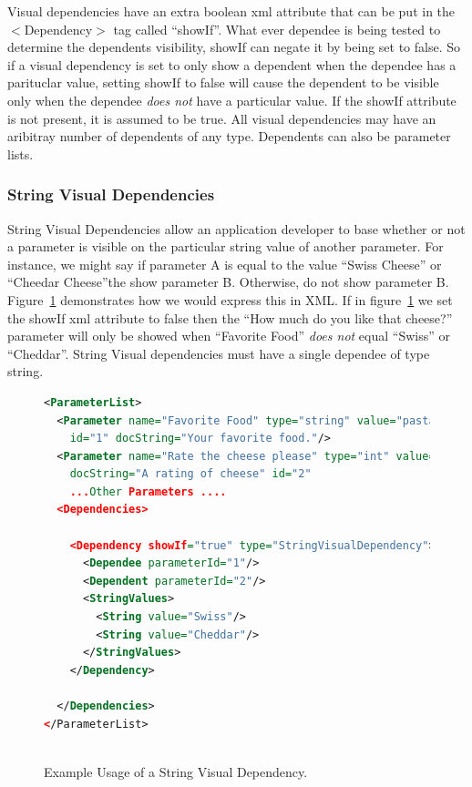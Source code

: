 Visual dependencies have an extra boolean xml attribute that can be put in the $<$Dependency$>$ tag called ``showIf''. What ever dependee is being tested to 
determine the dependents visibility, showIf can negate it by being set to false. So if a visual dependency is set to only show a dependent when the
dependee has a parituclar value, setting showIf to false will cause the dependent to be visible only when the dependee \emph{does not} have a particular
value. If the showIf attribute is not present, it is assumed to be true. All visual dependencies may have an aribitray number of dependents of any type.
Dependents can also be parameter lists.

\subsubsection{String Visual Dependencies}
String Visual Dependencies allow an application developer to base whether or not a parameter is visible on the particular string value of another
parameter. For instance, we might say if parameter A is equal to the value ``Swiss Cheese'' or ``Cheedar Cheese''the show parameter B. Otherwise, do not 
show parameter B. Figure~\ref{StringVisXML} demonstrates how we would express this in XML.  If in figure~\ref{StringVisXML} we set the showIf xml attribute to false then the ``How much do you like that cheese?'' parameter will only be showed when ``Favorite Food'' \emph{does not} equal ``Swiss'' or ``Cheddar''.
String Visual dependencies must have a single dependee of type string. 
\begin{figure}
\centering
\begin{lstlisting}[language=XML]
<ParameterList>
  <Parameter name="Favorite Food" type="string" value="pasta"
    id="1" docString="Your favorite food."/>
  <Parameter name="Rate the cheese please" type="int" value="5"
    docString="A rating of cheese" id="2"
    ...Other Parameters ....
  <Dependencies>

    <Dependency showIf="true" type="StringVisualDependency">
      <Dependee parameterId="1"/>
      <Dependent parameterId="2"/>
      <StringValues>
        <String value="Swiss"/>
        <String value="Cheddar"/>
      </StringValues>
    </Dependency>

  </Dependencies>
</ParameterList>
        
\end{lstlisting}
\caption{Example Usage of a String Visual Dependency.}
\label{StringVisXML}
\end{figure}

